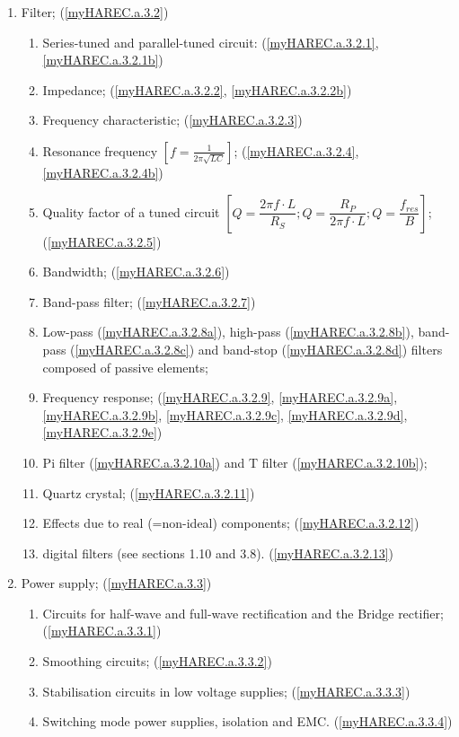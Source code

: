 \begin{enumerate}
\begin{enumerate}
\item Filter; (\ref{myHAREC.a.3.2})\label{HAREC.a.3.2}
\begin{enumerate}
\item Series-tuned and parallel-tuned circuit:
  (\ref{myHAREC.a.3.2.1}, \ref{myHAREC.a.3.2.1b})\label{HAREC.a.3.2.1}
\item Impedance;
  (\ref{myHAREC.a.3.2.2}, \ref{myHAREC.a.3.2.2b})\label{HAREC.a.3.2.2}
\item Frequency characteristic;  (\ref{myHAREC.a.3.2.3})\label{HAREC.a.3.2.3}
\item Resonance frequency \(\left[f=\frac{1}{2\pi\sqrt{LC}}\right]\);
  (\ref{myHAREC.a.3.2.4}, \ref{myHAREC.a.3.2.4b})\label{HAREC.a.3.2.4}
\item Quality factor of a tuned circuit \(\left[Q=\dfrac{2\pi f \cdot L}{R_S};
    Q=\dfrac{R_P}{2\pi f \cdot L}; Q=\dfrac{f_{res}}{B}\right]\);
  (\ref{myHAREC.a.3.2.5})\label{HAREC.a.3.2.5}
\item Bandwidth; (\ref{myHAREC.a.3.2.6})\label{HAREC.a.3.2.6}
\item Band-pass filter; (\ref{myHAREC.a.3.2.7})\label{HAREC.a.3.2.7}
\item Low-pass (\ref{myHAREC.a.3.2.8a})\label{HAREC.a.3.2.8a},
  high-pass (\ref{myHAREC.a.3.2.8b})\label{HAREC.a.3.2.8b},
  band-pass (\ref{myHAREC.a.3.2.8c})\label{HAREC.a.3.2.8c}
  and band-stop (\ref{myHAREC.a.3.2.8d})\label{HAREC.a.3.2.8d}
  filters composed of passive elements;
\item Frequency response; (\ref{myHAREC.a.3.2.9}, \ref{myHAREC.a.3.2.9a},
  \ref{myHAREC.a.3.2.9b}, \ref{myHAREC.a.3.2.9c}, \ref{myHAREC.a.3.2.9d},
  \ref{myHAREC.a.3.2.9e})\label{HAREC.a.3.2.9}
\item Pi filter (\ref{myHAREC.a.3.2.10a})\label{HAREC.a.3.2.10a}
  and T filter (\ref{myHAREC.a.3.2.10b})\label{HAREC.a.3.2.10b};
\item Quartz crystal; (\ref{myHAREC.a.3.2.11})\label{HAREC.a.3.2.11}
\item Effects due to real (=non-ideal) components;
  (\ref{myHAREC.a.3.2.12})\label{HAREC.a.3.2.12}
\item digital filters (see sections 1.10 and 3.8).
  (\ref{myHAREC.a.3.2.13})\label{HAREC.a.3.2.13}
\end{enumerate}

\item Power supply; (\ref{myHAREC.a.3.3})\label{HAREC.a.3.3}
\begin{enumerate}
\item Circuits for half-wave and full-wave rectification and the Bridge
  rectifier; (\ref{myHAREC.a.3.3.1})\label{HAREC.a.3.3.1}
\item Smoothing circuits; (\ref{myHAREC.a.3.3.2})\label{HAREC.a.3.3.2}
\item Stabilisation circuits in low voltage supplies;
  (\ref{myHAREC.a.3.3.3})\label{HAREC.a.3.3.3}
\item Switching mode power supplies, isolation and EMC.
  (\ref{myHAREC.a.3.3.4})\label{HAREC.a.3.3.4}
\end{enumerate}


\end{enumerate}
\end{enumerate}
